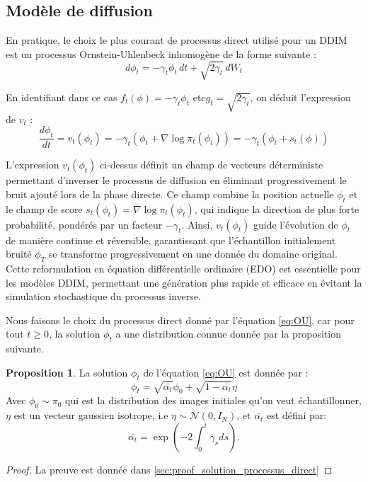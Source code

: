 \documentclass[a4paper,10pt]{article}
\theoremstyle{definition} %
\theoremstyle{definition} %
\newtheorem{proposition}[definition]{Proposition}
\theoremstyle{definition} %
\theoremstyle{definition} %
\begin{document}
\subsection{Modèle de diffusion}
En pratique, le choix le plus courant de processus direct utilisé pour un DDIM est un processus Ornstein-Uhlenbeck inhomogène de la forme suivante :
\begin{equation}\label{eq:OU}
    d\phi_t = -\gamma_t\phi_t \,dt + \sqrt{2\gamma_t}\,dW_t
\end{equation}

En identifiant dans ce cas $f_t(\phi) = -\gamma_t\phi_t$ etc$ g_t =  \sqrt{2\gamma_t}$, on déduit l'expression de $v_t$ :
\begin{equation}\label{eq:backward}
    \frac{d\phi_t}{dt} = v_t(\phi_t) = -\gamma_t(\phi_t+\nabla \log \pi_t(\phi_t)) = -\gamma_t(\phi_t+s_t(\phi))
\end{equation}

L'expression \( v_t(\phi_t) \) ci-dessus définit un champ de vecteurs déterministe permettant d'inverser le processus de diffusion en éliminant progressivement le bruit ajouté lors de la phase directe. Ce champ combine la position actuelle \( \phi_t \) et le champ de score \( s_t(\phi_t) = \nabla \log \pi_t(\phi_t) \), qui indique la direction de plus forte probabilité, pondérés par un facteur \( -\gamma_t \). Ainsi, \( v_t(\phi_t) \) guide l'évolution de \( \phi_t \) de manière continue et réversible, garantissant que l'échantillon initialement bruité \( \phi_T \) se transforme progressivement en une donnée du domaine original. Cette reformulation en équation différentielle ordinaire (EDO) est essentielle pour les modèles DDIM, permettant une génération plus rapide et efficace en évitant la simulation stochastique du processus inverse.

Nous faisons le choix du processus direct donné par l'équation \eqref{eq:OU}, car pour tout $t \geq 0$, la solution $\phi_t$ a une distribution connue donnée par la proposition suivante.
\begin{proposition}\label{prop:solution_processus_direct}
    La solution $\phi_t$ de l'équation \eqref{eq:OU} est donnée par :
    \begin{equation}\label{eq:solforphi}
        \phi_t = \sqrt{\bar{\alpha_t}}\phi_0 + \sqrt{1-\bar{\alpha_t}}\eta
    \end{equation}
    Avec $\phi_0 \sim \pi_0$ qui est la distribution des images initiales qu'on veut échantillonner, $\eta$ est un vecteur gaussien isotrope, i.e $\eta \sim \mathcal{N}(0, I_N)$, et $\bar{\alpha_t}$ est défini par: \[\bar{\alpha_t} = \exp{\left(-2\int_0^t \gamma_s ds\right)}.\]
    
\end{proposition}
\begin{proof}
    La preuve est donnée dans \cref{sec:proof_solution_processus_direct}
\end{proof}
\end{document}
